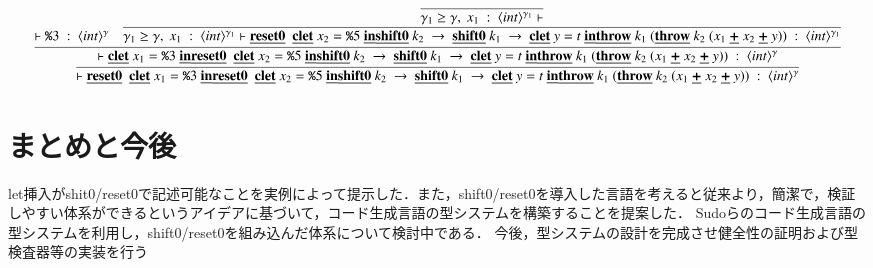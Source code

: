 \documentclass[10pt,a4j,twocolumn]{jarticle}
\newcommand\cResetz{\underline{\textbf{reset0}}}
\newcommand\cShiftz{\underline{\textbf{shift0}}}
\newcommand\cThrow{\underline{\textbf{throw}}}
\newcommand\cPlus{\underline{\textbf{+}}}
\newcommand\cLet{\underline{\textbf{clet}}}
\newcommand\cIn{\underline{\textbf{in}}}
\newcommand\csp[1]{\texttt{\%}{#1}}
\newcommand\codeT[2]{\langle{#1}\rangle^{#2}}
\newcommand\ord{\ge}
\theoremstyle{definition}
\begin{document}
\[
  \infer{
    \vdash
    \cResetz ~~\cLet~x_1=\csp{3}~\cIn \\
    \cResetz ~~\cLet~x_2=\csp{5}~\cIn \\
    \cShiftz~k_2~\to~ \cShiftz~k_1~\to~ \cLet~y=t~\cIn \\
    \cThrow~k_1~(\cThrow~k_2~(x_1~\cPlus~x_2~\cPlus~y)) ~:~ \codeT{int}{\gamma}}
  {
    \infer{
      \vdash
      \cLet~x_1=\csp{3}~\cIn \\
      \cResetz ~~\cLet~x_2=\csp{5}~\cIn \\
      \cShiftz~k_2~\to~ \cShiftz~k_1~\to~ \cLet~y=t~\cIn \\
      \cThrow~k_1~(\cThrow~k_2~(x_1~\cPlus~x_2~\cPlus~y)) ~:~ \codeT{int}{\gamma}}
    {
      \vdash \csp{3} ~:~ \codeT{int}{\gamma}
      &
      \infer{
        \gamma_1 \ord \gamma,~
        x_1 ~:~ \codeT{int}{\gamma_1}
        \vdash
        \cResetz ~~\cLet~x_2=\csp{5}~\cIn \\
        \cShiftz~k_2~\to~ \cShiftz~k_1~\to~ \cLet~y=t~\cIn \\
        \cThrow~k_1~(\cThrow~k_2~(x_1~\cPlus~x_2~\cPlus~y)) ~:~ \codeT{int}{\gamma_1}}
      {
        \infer{
          \gamma_1 \ord \gamma,~
          x_1 ~:~ \codeT{int}{\gamma_1}
          \vdash
        }
        {}
      }
    }
  }
\]


\section{まとめと今後}
let挿入がshit0/reset0で記述可能なことを実例によって提示した．また，shift0/reset0を導入した言語を考えると従来より，簡潔で，検証しやすい体系ができるというアイデアに基づいて，コード生成言語の型システムを構築することを提案した．
Sudoらのコード生成言語の型システム\cite{Sudo2014}を利用し，shift0/reset0を組み込んだ体系について検討中である．
今後，型システムの設計を完成させ健全性の証明および型検査器等の実装を行う



\end{document}
